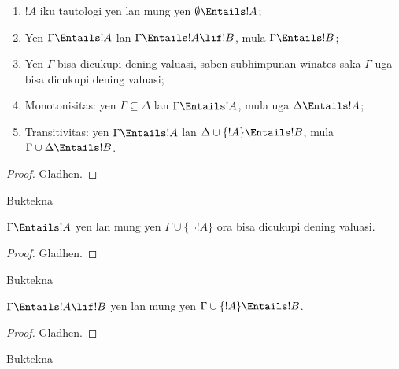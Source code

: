 \documentclass[../../../include/open-logic-section]{subfiles}
\begin{document}
\begin{prop}
\begin{enumerate} 
\item $!A$ iku tautologi yen lan mung yen
  $\emptyset \Entails !A$; 
\item Yen $\Gamma \Entails !A$ lan $\Gamma \Entails !A \lif !B$, mula
  $\Gamma \Entails !B$;
\item Yen $\Gamma$ bisa dicukupi dening valuasi, saben subhimpunan winates saka
  $\Gamma$ uga bisa dicukupi dening valuasi; 
\item {} Monotonisitas: yen $\Gamma \subseteq \Delta$
  lan $\Gamma \Entails !A$, mula uga $\Delta \Entails !A$;
\item {} Transitivitas: yen $\Gamma \Entails !A$ lan
  $\Delta \cup \{ !A\} \Entails !B$, mula $\Gamma \cup \Delta \Entails
  !B$.
\end{enumerate}
\end{prop}

\begin{proof}
Gladhen.
\end{proof}

\begin{prob}
Buktekna 
\end{prob}

\begin{prop}
  $\Gamma \Entails !A$ yen lan mung yen $\Gamma \cup \{\lnot !A\}$
  ora bisa dicukupi dening valuasi.
\end{prop}

\begin{proof}
Gladhen.
\end{proof}

\begin{prob}
Buktekna 
\end{prob}

\begin{thm}
   $\Gamma \Entails !A \lif !B$ yen lan mung
  yen $\Gamma \cup \{!A\} \Entails !B$.
\end{thm}

\begin{proof}
Gladhen.
\end{proof}

\begin{prob}
Buktekna 
\end{prob}
\end{document}
